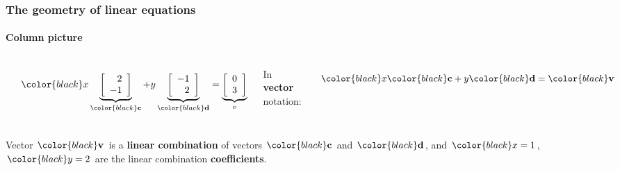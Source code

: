 \documentclass[compress]{beamer}
\newcommand{\black}[1]{{\color{black}#1}}
\renewcommand{\emph}[1]{\textbf{\black{#1}}}
\newcommand{\beq}[1]{\[\black{#1}\]}
\renewcommand{\cv}{\black{\mathbf{c}}}
\renewcommand{\d}{\black{\mathbf{d}}}
\renewcommand{\v}{\black{\mathbf{v}}}
\begin{document}
\begin{frame}
\frametitle{The geometry of linear equations}
\framesubtitle{Column picture}

\begin{columns}
\begin{center}
\includegraphics[trim = 2mm 2mm 2mm 2mm, clip, width=.7\textwidth]{./img/col-pic}
\end{center}

\beq{
x\underbrace{\left[
\begin{array}{r}
2\\-1
\end{array}
\right]}_{\cv}+
y\underbrace{\left[
\begin{array}{r}
-1\\2
\end{array}
\right]}_{\d}=
\underbrace{\left[
\begin{array}{r}
0\\3
\end{array}
\right]}_{v}
}

In \emph{vector} notation:

\beq{
x\cv + y\d = \v
}

\end{columns}

\vspace{.5cm}
Vector $\v$ is a \emph{linear combination} of vectors $\cv$ and $\d$, and $\black{x=1}$, $\black{y=2}$ are the linear combination \emph{coefficients}.

\end{frame}
\end{document}
